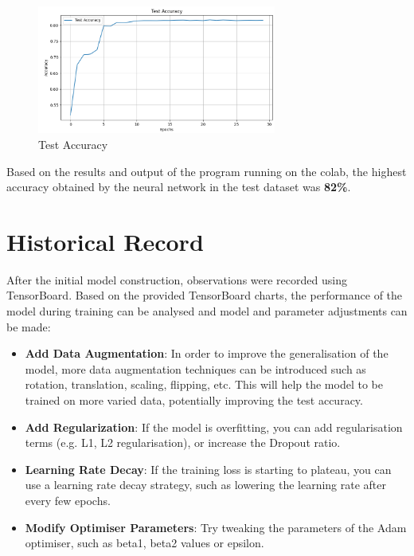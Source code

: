 \documentclass[11pt,en]{elegantpaper}
\begin{document}
\begin{figure}[htbp]
  \centering %
  \includegraphics[width=0.7\textwidth]{fig/Test_Accuracy.png} %
  \caption{Test Accuracy}
  \end{figure}

Based on the results and output of the program running on the colab, the highest accuracy obtained by the neural network in the test dataset was \textbf{82\%}.

\section{Historical Record}

After the initial model construction, observations were recorded using TensorBoard. Based on the provided TensorBoard charts, the performance of the model during training can be analysed and model and parameter adjustments can be made:

\begin{itemize}
  \item \textbf{Add Data Augmentation}: In order to improve the generalisation of the model, more data augmentation techniques can be introduced such as rotation, translation, scaling, flipping, etc. This will help the model to be trained on more varied data, potentially improving the test accuracy.
  \item \textbf{Add Regularization}: If the model is overfitting, you can add regularisation terms (e.g. L1, L2 regularisation), or increase the Dropout ratio.
  \item \textbf{Learning Rate Decay}: If the training loss is starting to plateau, you can use a learning rate decay strategy, such as lowering the learning rate after every few epochs.
  \item \textbf{Modify Optimiser Parameters}: Try tweaking the parameters of the Adam optimiser, such as beta1, beta2 values or epsilon.
\end{itemize}


\end{document}
